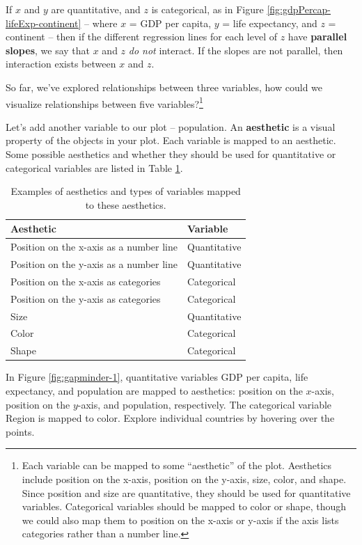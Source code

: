 \documentclass[
  10pt,
  openany]{book}
\theoremstyle{definition}
\theoremstyle{definition}
\theoremstyle{definition}
\theoremstyle{definition}
\theoremstyle{remark}
\begin{document}
If \(x\) and \(y\) are quantitative, and \(z\) is categorical, as in Figure \ref{fig:gdpPercap-lifeExp-continent} -- where \(x\) = GDP per capita, \(y\) = life expectancy, and \(z\) = continent -- then if the different regression lines for each level of \(z\) have \textbf{parallel slopes}, we say that \(x\) and \(z\) \emph{do not} interact. If the slopes are not parallel, then interaction exists between \(x\) and \(z\).

So far, we've explored relationships between three variables, how could we visualize relationships between five variables?\footnote{Each variable can be mapped to some ``aesthetic'' of the plot. Aesthetics include position on the x-axis, position on the y-axis, size, color, and shape. Since position and size are quantitative, they should be used for quantitative variables. Categorical variables should be mapped to color or shape, though we could also map them to position on the x-axis or y-axis if the axis lists categories rather than a number line.}

Let's add another variable to our plot -- population. An \textbf{aesthetic} is a visual property of the objects in your plot. Each variable is mapped to an aesthetic. Some possible aesthetics and whether they should be used for quantitative or categorical variables are listed in Table \ref{tab:aesthetics}.

\begin{table}

\caption{\label{tab:aesthetics}Examples of aesthetics and types of variables mapped to these aesthetics.}
\centering
\begin{tabular}[t]{l|l}
\hline
Aesthetic & Variable\\
\hline
Position on the x-axis as a number line & Quantitative\\
\hline
Position on the y-axis as a number line & Quantitative\\
\hline
Position on the x-axis as categories & Categorical\\
\hline
Position on the y-axis as categories & Categorical\\
\hline
Size & Quantitative\\
\hline
Color & Categorical\\
\hline
Shape & Categorical\\
\hline
\end{tabular}
\end{table}

In Figure \ref{fig:gapminder-1}, quantitative variables GDP per capita, life expectancy, and population are mapped to aesthetics: position on the \(x\)-axis, position on the \(y\)-axis, and population, respectively. The categorical variable Region is mapped to color. Explore individual countries by hovering over the points.
\end{document}
